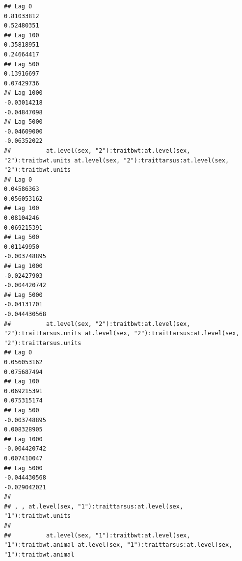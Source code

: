 \documentclass[
  12pt,
]{book}
\begin{document}
\begin{verbatim}
## Lag 0                                                          0.81033812                                                          0.52480351
## Lag 100                                                        0.35818951                                                          0.24664417
## Lag 500                                                        0.13916697                                                          0.07429736
## Lag 1000                                                      -0.03014218                                                         -0.04847098
## Lag 5000                                                      -0.04609000                                                         -0.06352022
##          at.level(sex, "2"):traitbwt:at.level(sex, "2"):traitbwt.units at.level(sex, "2"):traittarsus:at.level(sex, "2"):traitbwt.units
## Lag 0                                                       0.04586363                                                      0.056053162
## Lag 100                                                     0.08104246                                                      0.069215391
## Lag 500                                                     0.01149950                                                     -0.003748895
## Lag 1000                                                   -0.02427903                                                     -0.004420742
## Lag 5000                                                   -0.04131701                                                     -0.044430568
##          at.level(sex, "2"):traitbwt:at.level(sex, "2"):traittarsus.units at.level(sex, "2"):traittarsus:at.level(sex, "2"):traittarsus.units
## Lag 0                                                         0.056053162                                                         0.075687494
## Lag 100                                                       0.069215391                                                         0.075315174
## Lag 500                                                      -0.003748895                                                         0.008328905
## Lag 1000                                                     -0.004420742                                                         0.007410047
## Lag 5000                                                     -0.044430568                                                        -0.029042021
## 
## , , at.level(sex, "1"):traittarsus:at.level(sex, "1"):traitbwt.units
## 
##          at.level(sex, "1"):traitbwt:at.level(sex, "1"):traitbwt.animal at.level(sex, "1"):traittarsus:at.level(sex, "1"):traitbwt.animal

\end{verbatim}
\end{document}
